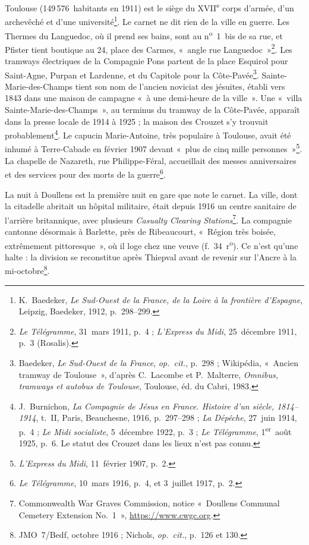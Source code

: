 Toulouse (149\,576~habitants en 1911) est le siège du XVII\textsuperscript{e} corps d'armée, d'un archevêché et d'une université\footnote{K.~Baedeker, \textit{Le Sud-Ouest de la France, de la Loire à la frontière d'Espagne}, Leipzig, Baedeker, 1912, p.~298--299.}. Le carnet ne dit rien de la ville en guerre. Les Thermes du Languedoc, où il prend ses bains, sont au n\textsuperscript{o}~1~bis de sa rue, et Pfister tient boutique au 24, place des Carmes, «~angle rue Languedoc~»\footnote{\textit{Le Télégramme}, 31~mars 1911, p.~4 ; \textit{L'Express du Midi}, 25~décembre 1911, p.~3 (Rosalis).}. Les tramways électriques de la Compagnie Pons partent de la place Esquirol pour Saint-Agne, Purpan et Lardenne, et du Capitole pour la Côte-Pavée\footnote{Baedeker, \textit{Le Sud-Ouest de la France}, \textit{op.~cit.}, p.~298 ; Wikipédia, «~Ancien tramway de Toulouse~», d'après C.~Lacombe et P.~Malterre, \textit{Omnibus, tramways et autobus de Toulouse}, Toulouse, éd. du Cabri, 1983.}. Sainte-Marie-des-Champs tient son nom de l'ancien noviciat des jésuites, établi vers 1843 dans une maison de campagne «~à une demi-heure de la ville~». Une «~villa Sainte-Marie-des-Champs~», au terminus du tramway de la Côte-Pavée, apparaît dans la presse locale de 1914 à 1925 ; la maison des Crouzet s'y trouvait probablement\footnote{J.~Burnichon, \textit{La Compagnie de Jésus en France. Histoire d'un siècle, 1814--1914}, t.~II, Paris, Beauchesne, 1916, p.~297--298 ; \textit{La Dépêche}, 27~juin 1914, p.~4 ; \textit{Le Midi socialiste}, 5~décembre 1922, p.~3 ; \textit{Le Télégramme}, 1\textsuperscript{er}~août 1925, p.~6. Le statut des Crouzet dans les lieux n'est pas connu.}. Le capucin Marie-Antoine, très populaire à Toulouse, avait été inhumé à Terre-Cabade en février 1907 devant «~plus de cinq mille personnes~»\footnote{\textit{L'Express du Midi}, 11~février 1907, p.~2.}. La chapelle de Nazareth, rue Philippe-Féral, accueillait des messes anniversaires et des services pour des morts de la guerre\footnote{\textit{Le Télégramme}, 10~mars 1916, p.~4, et 3~juillet 1917, p.~2.}.

La nuit à Doullens est la première nuit en gare que note le carnet. La ville, dont la citadelle abritait un hôpital militaire, était depuis 1916 un centre sanitaire de l'arrière britannique, avec plusieurs \textit{Casualty Clearing Stations}\footnote{Commonwealth War Graves Commission, notice «~Doullens Communal Cemetery Extension No.~1~», \url{https://www.cwgc.org}.}. La compagnie cantonne désormais à Barlette, près de Ribeaucourt, «~Région très boisée, extrêmement pittoresque~», où il loge chez une veuve (f.~34~r\textsuperscript{o}). Ce n'est qu'une halte : la division se reconstitue après Thiepval avant de revenir sur l'Ancre à la mi-octobre\footnote{JMO~7/Bedf, octobre 1916 ; Nichols, \textit{op.~cit.}, p.~126 et 130.}.
